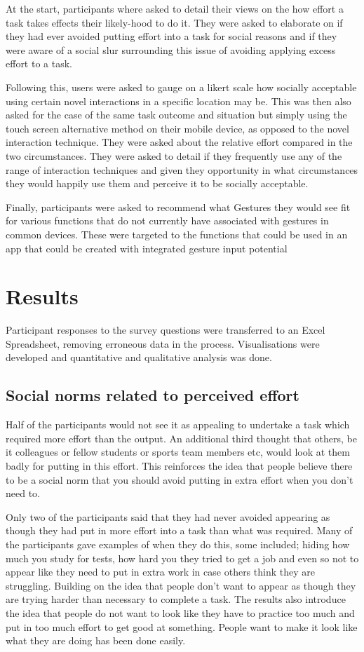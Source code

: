 \documentclass{l4proj}
\begin{document}
At the start, participants where asked to detail their views on the how effort a task takes effects their likely-hood to do it. They were asked to elaborate on if they had ever avoided putting effort into a task for social reasons and if they were aware of a social slur surrounding this issue of avoiding applying excess effort to a task.

Following this, users were asked to gauge on a likert scale how socially acceptable using certain novel interactions in a specific location may be. This was then also asked for the case of the same task outcome and situation but simply using the touch screen alternative method on their mobile device, as opposed to the novel interaction technique. They were asked about the relative effort compared in the two circumstances. They were asked to detail if they frequently use any of the range of interaction techniques and given they opportunity in what circumstances they would happily use them and perceive it to be socially acceptable.

Finally, participants were asked to recommend what Gestures they would see fit for various functions that do not currently have associated with gestures in common devices. These were targeted to the functions that could be used in an app that could be created with integrated gesture input potential

\section{Results}
Participant responses to the survey questions were transferred to an Excel Spreadsheet, removing erroneous data in the process. Visualisations were developed and quantitative and qualitative analysis was done.

\subsection{Social norms related to perceived effort}
Half of the participants would not see it as appealing to undertake a task which required more effort than the output. An additional third thought that others, be it colleagues or fellow students or sports team members etc, would look at them badly for putting in this effort. This reinforces the idea that people believe there to be a social norm that you should avoid putting in extra effort when you don't need to. 

Only two of the participants said that they had never avoided appearing as though they had put in more effort into a task than what was required. Many of the participants gave examples of when they do this, some included; hiding how much you study for tests, how hard you they tried to get a job and even so not to appear like they need to put in extra work in case others think they are struggling. Building on the idea that people don't want to appear as though they are trying harder than necessary to complete a task. The results also introduce the idea that people do not want to look like they have to practice too much and put in too much effort to get good at something. People want to make it look like what they are doing has been done easily. 
\end{document}
